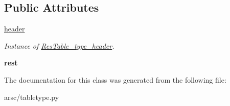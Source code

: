 \subsection*{Public Attributes}
\begin{DoxyCompactItemize}
\item 
\mbox{\label{classarsc_1_1tabletype_1_1ResTable__type_a569fdc08b8819b982379aead3b6f20e4}} 
\mbox{\hyperlink{classarsc_1_1tabletype_1_1ResTable__type_a569fdc08b8819b982379aead3b6f20e4}{header}}
\begin{DoxyCompactList}\small\item\em Instance of \mbox{\hyperlink{classarsc_1_1tabletype_1_1ResTable__type__header}{Res\+Table\+\_\+type\+\_\+header}}. \end{DoxyCompactList}\item 
\mbox{\label{classarsc_1_1tabletype_1_1ResTable__type_aeb001aae3b1c40761329319690744547}} 
{\bfseries rest}
\end{DoxyCompactItemize}


The documentation for this class was generated from the following file\+:\begin{DoxyCompactItemize}
\item 
arsc/tabletype.\+py\end{DoxyCompactItemize}
